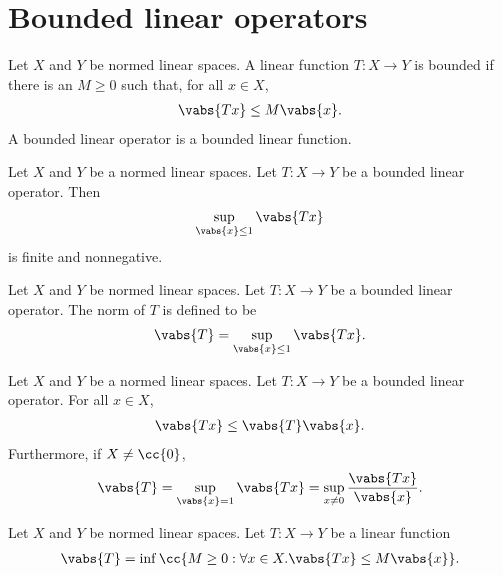 \documentclass{article}
\begin{document}
\section{Bounded linear operators}\label{sec:bounded-linear-operators}

\begin{definition}
  Let $X$ and $Y$ be normed linear spaces. A linear function $T:X\to Y$ is bounded
  if there is an $M\geq 0$ such that, for all $x\in X$,
  \begin{align*}
    \vabs{Tx}\leq M\vabs{x}.
  \end{align*}
  A bounded linear operator is a bounded linear function.
\end{definition}

\begin{lemma}
  Let $X$ and $Y$ be a normed linear spaces. Let $T:X\to Y$ be a bounded linear operator.
  Then
  \begin{align*}
    \sup_{\vabs{x}\leq 1}\vabs{Tx}
  \end{align*}
  is finite and nonnegative.
\end{lemma}

\begin{definition}
  Let $X$ and $Y$ be normed linear spaces. Let $T:X\to Y$ be a bounded linear operator.
  The norm of $T$ is defined to be
  \begin{align*}
    \vabs{T}=\sup_{\vabs{x}\leq 1}\vabs{T x}.
  \end{align*}
\end{definition}

\begin{lemma}
  Let $X$ and $Y$ be a normed linear spaces. Let $T:X\to Y$ be a bounded linear operator.
  For all $x\in X$,
  \begin{align*}
    \vabs{Tx}\leq \vabs{T}\vabs{x}.
  \end{align*}
  Furthermore, if $X\neq\cc{0}$,
  \begin{align*}
    \vabs{T}=\sup_{\vabs{x}=1}\vabs{Tx}=\sup_{x\neq 0}\frac{\vabs{Tx}}{\vabs{x}}.
  \end{align*}
\end{lemma}

\begin{theorem}
  Let $X$ and $Y$ be normed linear spaces. Let $T:X\to Y$ be a linear function
  \begin{align*}
    \vabs{T}=\inf\cc{M\geq 0 : \forall x \in X. \vabs{Tx}\leq M\vabs{x}}.
  \end{align*}
\end{theorem}
\end{document}
